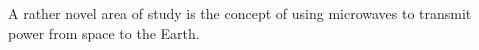 
A rather novel area of study is the concept of using microwaves
to transmit power from space to the Earth.

